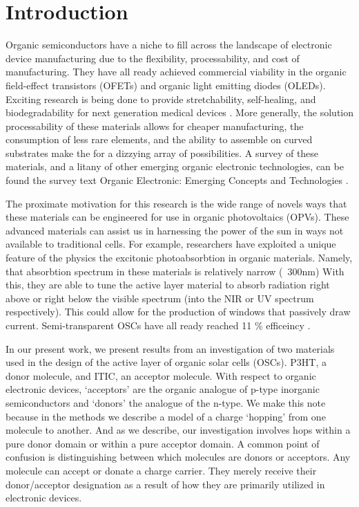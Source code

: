 \chapter{Introduction} 
Organic semiconductors have a niche to fill across the landscape of electronic
device manufacturing due to the flexibility, processability, and cost of manufacturing. They have all ready
achieved commercial viability in the organic field-effect transistors (OFETs) and organic light emitting
diodes (OLEDs).
Exciting research is being done to provide stretchability, self-healing, and biodegradability for 
next generation medical devices \cite{Brutting2006}.
More generally, the solution processability of these materials allows for
cheaper manufacturing, the consumption of less rare elements, and the ability to assemble on curved substrates make the for a dizzying array of possibilities. A survey of these materials, and a litany of
other emerging organic electronic technologies, can be found the survey text 
Organic Electronic: Emerging Concepts and Technologies
\cite{FabioCicoiraEditor2013}. 

The proximate motivation for this research is the wide range of novels ways that these materials can be
engineered for use in organic photovoltaics (OPVs). These advanced materials
can assist us in harnessing the power of the sun in ways not available to traditional cells. 
For example, researchers have exploited a unique feature of the physics the excitonic photoabsorbtion in 
organic materials.  Namely, that absorbtion spectrum
in these materials is relatively narrow (~300nm)
With this, they are able to tune the active layer material to absorb radiation right above or right below the
visible spectrum (into the NIR or UV spectrum respectively). This 
could allow for the production of windows that passively draw current. Semi-transparent OSCs have all ready
reached 11 \% efficeincy \cite{Brabec2020}. 

In our present work, we present results from an investigation of two materials
used in the design of the active layer of organic solar cells (OSCs). P3HT, a
donor molecule, and ITIC, an acceptor molecule. With respect to organic electronic devices, `acceptors' are the
organic analogue of p-type inorganic semiconductors and `donors' the analogue
of the n-type. We make this note because in the methods we describe a model of
a charge `hopping' from one molecule to another. And as we describe, our
investigation involves hops within a pure donor domain or within a pure
acceptor domain. A common point of confusion is distinguishing between which
molecules are donors or acceptors.
Any molecule can accept or donate a charge carrier.
They merely receive their donor/acceptor designation as a result of how they
are primarily utilized in electronic devices. 

